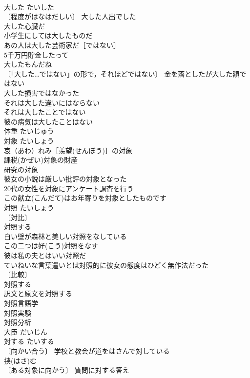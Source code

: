 \documentclass[8pt]{extreport}
\begin{document}
\begin{CJK}{UTF8}{min}
\\	大した	たいした	
\\	〔程度がはなはだしい〕 大した人出でした 
\\	大した心臓だ 
\\	小学生にしては大したものだ 
\\	あの人は大した芸術家だ［ではない］ 
\\	5千万円貯金したって
\\	大したもんだね 
\\	〔「大した…ではない」の形で，それほどではない〕 金を落としたが大した額ではない 
\\	大した損害ではなかった 
\\	それは大した違いにはならない 
\\	それは大したことではない 
\\	彼の病気は大したことはない 
\\	体重	たいじゅう	
\\	対象	たいしょう	
\\	哀（あわ）れみ［羨望(せんぼう)］の対象 
\\	課税(かぜい)対象の財産 
\\	研究の対象 
\\	彼女の小説は厳しい批評の対象となった 
\\	20代の女性を対象にアンケート調査を行う 
\\	この献立(こんだて)はお年寄りを対象としたものです 
\\	対照	たいしょう	
\\	〔対比〕
\\	対照する 
\\	白い壁が森林と美しい対照をなしている 
\\	この二つは好(こう)対照をなす 
\\	彼は私の夫とはいい対照だ 
\\	ていねいな言葉遣いとは対照的に彼女の態度はひどく無作法だった 
\\	〔比較〕
\\	対照する 
\\	訳文と原文を対照する 
\\	対照言語学 
\\	対照実験 
\\	対照分析 
\\	大臣	だいじん	
\\	対する	たいする	
\\	〔向かい合う〕 学校と教会が道をはさんで対している 
\\	挟(はさ)む　
\\	〔ある対象に向かう〕 質問に対する答え 

\end{CJK}
\end{document}
